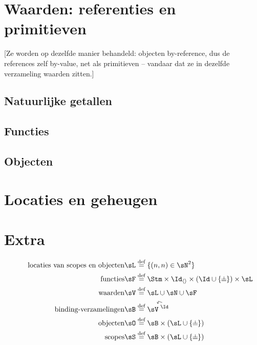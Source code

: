 \section{Waarden: referenties en primitieven}
\label{sec:waarden}

[Ze worden op dezelfde manier behandeld: objecten by-reference, dus de references zelf by-value, net als primitieven -- vandaar dat ze in dezelfde verzameling waarden zitten.]

\subsection{Natuurlijke getallen}

\subsection{Functies}

\subsection{Objecten}

\section{Locaties en geheugen}\label{sec:locaties}

\section*{Extra}

\begin{align*}
  \tag*{locaties van scopes en objecten}
  \sL &\DEF \{ (n, n) \in \sN^2 \} \\
  \tag*{functies}
  \sF &\DEF \Stm \times \Id_{\langle\rangle} \times (\Id \cup \{\nil\}) \times \sL \\
  \tag*{waarden}
  \sV &\DEF \sL \cup \sN \cup \sF \\
  \tag*{binding-verzamelingen}
  \sB &\DEF \FiniteFunctions{\sV}{\Id} \\
  \tag*{objecten}
  \sO &\DEF \sB \times (\sL \cup \{\nil\}) \\
  \tag*{scopes}
  \sS &\DEF \sB \times (\sL \cup \{\nil\}) \\
\end{align*}

